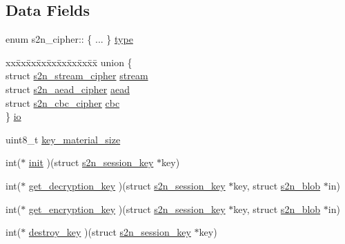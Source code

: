 \subsection*{Data Fields}
\begin{DoxyCompactItemize}
\item 
enum s2n\+\_\+cipher\+:: \{ ... \}  \hyperlink{structs2n__cipher_a7d741701c2036f0ec21372f9d8271b6c}{type}
\item 
\begin{tabbing}
xx\=xx\=xx\=xx\=xx\=xx\=xx\=xx\=xx\=\kill
union \{\\
\>struct \hyperlink{structs2n__stream__cipher}{s2n\_stream\_cipher} \hyperlink{structs2n__cipher_a86b4ea19595781516c4e0a14c959db1c}{stream}\\
\>struct \hyperlink{structs2n__aead__cipher}{s2n\_aead\_cipher} \hyperlink{structs2n__cipher_a8d9b4c808e73d45bcd7d54784bef3ee0}{aead}\\
\>struct \hyperlink{structs2n__cbc__cipher}{s2n\_cbc\_cipher} \hyperlink{structs2n__cipher_a1d48a8097823a3ed051e801f20f149b4}{cbc}\\
\} \hyperlink{structs2n__cipher_a4ea01e42d7c92d02b72ff99c9cac3ab3}{io}\\

\end{tabbing}\item 
uint8\+\_\+t \hyperlink{structs2n__cipher_a4c6bbff7566595ecff207dc0b73b3ae8}{key\+\_\+material\+\_\+size}
\item 
int($\ast$ \hyperlink{structs2n__cipher_a80fc23a245ab999bcc8dcc5b949cc542}{init} )(struct \hyperlink{structs2n__session__key}{s2n\+\_\+session\+\_\+key} $\ast$key)
\item 
int($\ast$ \hyperlink{structs2n__cipher_ad1e19d6d38d153a7a35e69c00cf101c1}{get\+\_\+decryption\+\_\+key} )(struct \hyperlink{structs2n__session__key}{s2n\+\_\+session\+\_\+key} $\ast$key, struct \hyperlink{structs2n__blob}{s2n\+\_\+blob} $\ast$in)
\item 
int($\ast$ \hyperlink{structs2n__cipher_a4ceb5624c688f6180fd838ac799bde36}{get\+\_\+encryption\+\_\+key} )(struct \hyperlink{structs2n__session__key}{s2n\+\_\+session\+\_\+key} $\ast$key, struct \hyperlink{structs2n__blob}{s2n\+\_\+blob} $\ast$in)
\item 
int($\ast$ \hyperlink{structs2n__cipher_aefd41942eaf98d2033c2a778adac0149}{destroy\+\_\+key} )(struct \hyperlink{structs2n__session__key}{s2n\+\_\+session\+\_\+key} $\ast$key)
\end{DoxyCompactItemize}


